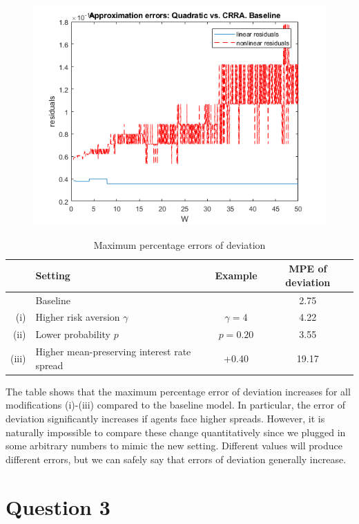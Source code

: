 \documentclass{article}
\begin{document}
\begin{figure}[h!]
\includegraphics[width = .8\textwidth, keepaspectratio]{ps4ex2fig2.png}
\end{figure}

\begin{table}[H]
\centering
\caption{Maximum percentage errors of deviation}
\vspace{.5cm}
\begin{tabular}{rlcc}
\hline
 & Setting & Example & MPE of deviation \\[.5em]
 \hline
 & Baseline & & 2.75 \\[1em]
 (i) & Higher risk aversion $\gamma$ & $\gamma = 4$ & 4.22 \\[1em]
 (ii) & Lower probability $p$ & $p = 0.20$ & 3.55 \\[1em]
 (iii) & Higher mean-preserving interest rate spread & +0.40 & 19.17\\[1em]
 \hline
\end{tabular}
\end{table}

The table shows that the maximum percentage error of deviation increases for all modifications (i)-(iii) compared to the baseline model. In particular, the error of deviation significantly increases if agents face higher spreads. However, it is naturally impossible to compare these change quantitatively since we plugged in some arbitrary numbers to mimic the new setting. Different values will produce different errors, but we can safely say that errors of deviation generally increase.

\section{Question 3}
\end{document}
